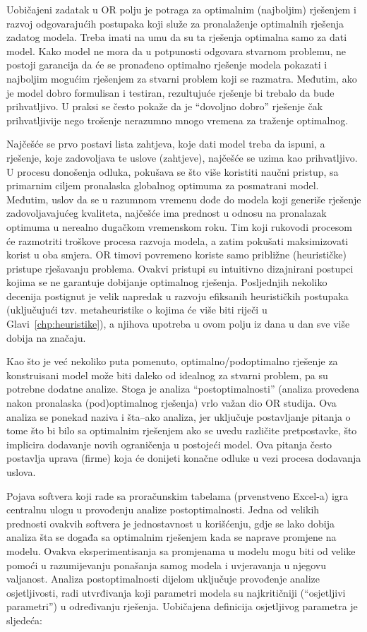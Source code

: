 \documentclass[a4paper, utf8, 11pt, colorlinks]{book}
\theoremstyle{definition}
\begin{document}
Uobičajeni zadatak u OR polju je potraga za optimalnim (najboljim) rješenjem i razvoj odgovarajućih postupaka koji služe za pronala\-ženje optimalnih rješenja zadatog modela. Treba imati na umu da su ta rješenja optimalna samo za dati model. Kako model ne mora da u potpunosti odgovara stvarnom problemu, ne postoji garancija da će se pronađeno optimalno rješenje modela pokazati i najboljim mogućim rješenjem za stvarni problem koji se razmatra. Međutim, ako je
model dobro formulisan i testiran, rezultujuće rješenje  bi trebalo da bude prihvatljivo. U praksi se često pokaže da je ``dovoljno dobro'' rješenje čak prihvatljivije nego trošenje nerazumno mnogo vremena za traženje optimalnog.

Najčešće se prvo postavi lista zahtjeva, koje dati model treba da ispuni, a rješenje, koje zadovoljava te uslove (zahtjeve), najčešće se   uzima kao prihvatljivo. U procesu donošenja odluka, pokušava se što više  koristiti naučni pristup, sa primarnim ciljem pronalaska globalnog optimuma za posmatrani model. Međutim,  uslov da se u razumnom vremenu dođe do modela koji generiše rješenje  zadovoljavajućeg kvaliteta, najčešće ima prednost u odnosu na pronalazak optimuma u nerealno dugačkom vremenskom roku. Tim  koji rukovodi procesom  će razmotriti troškove procesa razvoja modela, a zatim
pokušati maksimizovati korist u oba smjera. OR timovi povremeno koriste samo približne (heurističke) pristupe rješavanju problema. Ovakvi pristupi su intuitivno dizajnirani postupci kojima se ne garantuje dobijanje optimalnog rješenja. Posljednjih nekoliko decenija postignut je velik napredak u razvoju efiksanih heurističkih postupaka (uključujući tzv. metaheuristike o kojima će više biti riječi u Glavi~\ref{chp:heuristike}), a njihova upotreba u ovom polju iz dana u dan sve više dobija na značaju.  

Kao što je već nekoliko puta pomenuto,  optimalno/podoptimalno rješenje za konstruisani model može biti daleko od idealnog za stvarni problem, pa su potrebne dodatne analize. Stoga je analiza ``postoptimalnosti'' (analiza provedena nakon pronalaska (pod)optimalnog rješenja) vrlo važan dio OR studija.  Ova analiza se ponekad naziva i šta--ako analiza, jer uključuje postavljanje pitanja o tome što bi bilo sa optimalnim rješenjem ako se uvedu različite pretpostavke, što implicira dodavanje novih ograničenja u postojeći model. Ova pitanja često postavlja uprava (firme) koja će donijeti konačne odluke u vezi procesa dodavanja uslova. %

Pojava softvera koji rade sa proračunskim tabelama (prvenstveno Excel-a) igra centralnu ulogu u provođenju analize postoptimalnosti. Jedna od velikih prednosti ovakvih softvera je jednostavnost u korišćenju, gdje se lako dobija analiza šta se događa sa optimalnim rješenjem kada se naprave promjene na modelu.  Ovakva eksperimentisanja sa promjenama u modelu mogu biti od velike pomoći u razumijevanju ponašanja samog modela i uvjeravanja u njegovu valjanost.  Analiza postoptimalnosti dijelom  uključuje provođenje analize osjetljivosti, radi utvrđivanja koji parametri modela su najkritičniji (``osjetljivi parametri'') u određivanju rješenja. Uobičajena definicija osjetljivog parametra je sljedeća:
\end{document}
